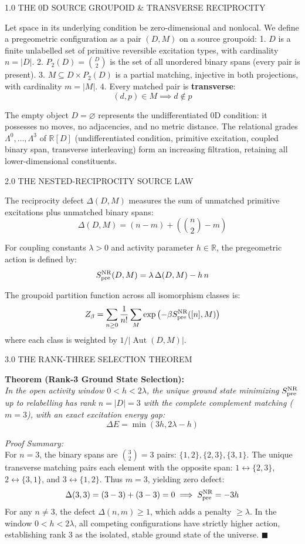 \documentclass[12pt,twoside,openright]{book}
\newcommand{\sceneheader}[1]{%
  \par\vspace{1.8em}%
  {\noindent\centering\scshape\large #1\par}%
  \vspace{1.0em}%
  \noindent%
}
\begin{document}
\sceneheader{1.0 THE 0D SOURCE GROUPOID \& TRANSVERSE
RECIPROCITY}

Let space in its underlying condition be zero-dimensional and nonlocal.
We define a pregeometric configuration as a pair \((D, M)\) on a source
groupoid: 1. \(D\) is a finite unlabelled set of primitive reversible
excitation types, with cardinality \(n = |D|\). 2.
\(P_2(D) = \binom{D}{2}\) is the set of all unordered binary spans
(every pair is present). 3. \(M \subseteq D \times P_2(D)\) is a partial
matching, injective in both projections, with cardinality \(m = |M|\).
4. Every matched pair is \textbf{transverse}:
\[(d, p) \in M \implies d \notin p\]

The empty object \(D = \varnothing\) represents the undifferentiated 0D
condition: it possesses no moves, no adjacencies, and no metric
distance. The relational grades \(\Lambda^0, \dots, \Lambda^3\) of
\(\mathbb{R}[D]\) (undifferentiated condition, primitive excitation,
coupled binary span, transverse interleaving) form an increasing
filtration, retaining all lower-dimensional constituents.

\sceneheader{2.0 THE NESTED-RECIPROCITY SOURCE
LAW}

The reciprocity defect \(\Delta(D, M)\) measures the sum of unmatched
primitive excitations plus unmatched binary spans:
\[\Delta(D, M) = (n - m) + \left( \binom{n}{2} - m \right)\]

For coupling constants \(\lambda > 0\) and activity parameter
\(h \in \mathbb{R}\), the pregeometric action is defined by:
\[S_{\rm pre}^{\rm NR}(D, M) = \lambda \, \Delta(D, M) - h \, n\]

The groupoid partition function across all isomorphism classes is:
\[Z_\beta = \sum_{n \ge 0} \frac{1}{n!} \sum_{M} \exp\left( -\beta S_{\rm pre}^{\rm NR}([n], M) \right)\]
where each class is weighted by \(1 / |\operatorname{Aut}(D, M)|\).

\sceneheader{3.0 THE RANK-THREE SELECTION
THEOREM}

\textbf{Theorem (Rank-3 Ground State Selection):}\\
\emph{In the open activity window \(0 < h < 2\lambda\), the unique
ground state minimizing \(S_{\rm pre}^{\rm NR}\) up to relabelling has
rank \(n = |D| = 3\) with the complete complement matching (\(m = 3\)),
with an exact excitation energy gap:}
\[\Delta E = \min(3h, 2\lambda - h)\]

\emph{Proof Summary:}\\
For \(n = 3\), the binary spans are \(\binom{3}{2} = 3\) pairs:
\(\{1,2\}, \{2,3\}, \{3,1\}\). The unique transverse matching pairs each
element with the opposite span: \(1 \leftrightarrow \{2,3\}\),
\(2 \leftrightarrow \{3,1\}\), and \(3 \leftrightarrow \{1,2\}\). Thus
\(m = 3\), yielding zero defect:
\[\Delta(3, 3) = (3 - 3) + (3 - 3) = 0 \implies S_{\rm pre}^{\rm NR} = -3h\]
For any \(n \neq 3\), the defect \(\Delta(n, m) \ge 1\), which adds a
penalty \(\ge \lambda\). In the window \(0 < h < 2\lambda\), all
competing configurations have strictly higher action, establishing rank
3 as the isolated, stable ground state of the universe. \(\blacksquare\)
\end{document}
